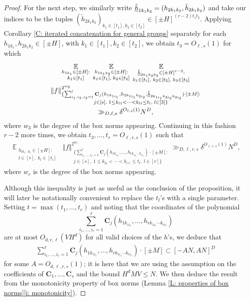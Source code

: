 \documentclass[11pt]{amsart}
\theoremstyle{definition}
\DeclareMathOperator*{\E}{\mathbb{E}}
\newcommand{\bc}{{\mathbf{C}}}
\newcommand{\uh}{{\underline{h}}}
\newcommand{\norm}[1]{\left\Vert #1\right\Vert}
\begin{document}
\begin{proof}
    For the next step, we similarly write $\Tilde{\uh}_{1k_1k_2}=(h_{2k_1k_2}, \Tilde{h}_{2k_1k_2})$ and take our indices to be the tuples $(\tilde{h}_{2k_1k_2})_{k_1\in[t_1], k_2\in[t_2]}\in[\pm H]^{(r-2)t_1 t_2}$.  Applying Corollary \ref{C: iterated concatenation for general groups} separately for each $h_{1k_1}, h_{2k_1k_2}\in[\pm H]$, with $k_1\in[t_1], k_2\in[t_2]$, we obtain $t_3 = O_{\ell, s}(1)$ for which
    \begin{multline*}
        \E_{\substack{h_{1k_1}\in[\pm H]:\\ k_1\in[t_1]}}\; \E_{\substack{h_{1k_1 k_2}\in[\pm H]:\\ k_1\in [t_1],\; k_2\in[t_2]}}\;
        \E_{\substack{\Tilde{\uh}_{2k_1 k_2 k_3}\in[\pm H]^{r-2}:\\ k_1\in [t_1],\; k_2\in[t_2],\; k_3\in[t_3]}}\\
        \norm{f}_{\substack{\{\sum_{i_1, i_2, i_3=1}^{\ell}\bc_j(h_{1k_{1i_1}}, h_{2k_{1i_1}k_{2i_2}}, \Tilde{\uh}_{2k_{1i_1}k_{2i_2}k_{3i_3}})\cdot[\pm M]:\\ j\in[s],\; 1\leq k_{l1} < \cdots < k_{l \ell}\leq t_l,\; l\in[3] \}}}^{2^{w_3}}\\ \gg_{D, \ell, s} \delta^{O_{\ell, s}(1)} N^D,
    \end{multline*}
    where $w_3$ is the degree of the box norms appearing. Continuing in this fashion $r-2$ more times, we obtain $t_3, \ldots, t_r=O_{\ell, r, s}(1)$ such that 
        \begin{align*}
        \E_{\substack{h_{lk_1\cdots k_l}\in[\pm H]:\\ l\in[r],\; k_l\in[t_l]}}\;
        \norm{f}_{\substack{\{\sum_{i_1, \ldots, i_r=1}^{\ell}\bc_j(h_{1k_{1i_1}}, \ldots, h_{rk_{1i_1}\cdots k_{ri_r}})\cdot[\pm M]:\\ j\in[s],\; 1\leq k_{l1} < \cdots < k_{l \ell}\leq t_l,\; l\in[r]\}}}^{2^{w_r}} \gg_{D, \ell, r, s} \delta^{O_{\ell, r, s}(1)} N^D,
    \end{align*}
    where $w_r$ is the degree of the box norms appearing.

Although this inequality is just as useful as the conclusion of the proposition, it will later be notationally convenient to replace the $t_l$'s with a single parameter. Setting $t=\max(t_1, \ldots, t_r)$ and noting that the coordinates of the polynomial $$\sum_{i_1, \ldots, i_r=1}^{\ell}\bc_j(h_{1k_{1i_1}}, \ldots, h_{rk_{1i_1}\cdots k_{ri_r}})$$ are at most $O_{d,r,\ell}(V H^d)$ {for all valid choices of the $h$'s}, we deduce that
    \begin{align*}
        \sum_{i_1, \ldots, i_r=1}^{\ell}\bc_j(h_{1k_{1i_1}}, \ldots, h_{rk_{1i_1}\cdots k_{ri_r}})\cdot[\pm M]\subset[-A N, AN]^D
    \end{align*}
    for some $A=O_{d, \ell, r, s}(1)$; it is here that we are using the assumption on the coefficients of $\bc_1, \ldots, \bc_s$ and the bound $H^d M V \leq N$. We then deduce the result from the monotonicity property of box norms (Lemma \ref{L: properties of box norms}\eqref{i: monotonicity}). 
\end{proof} 
\end{document}
